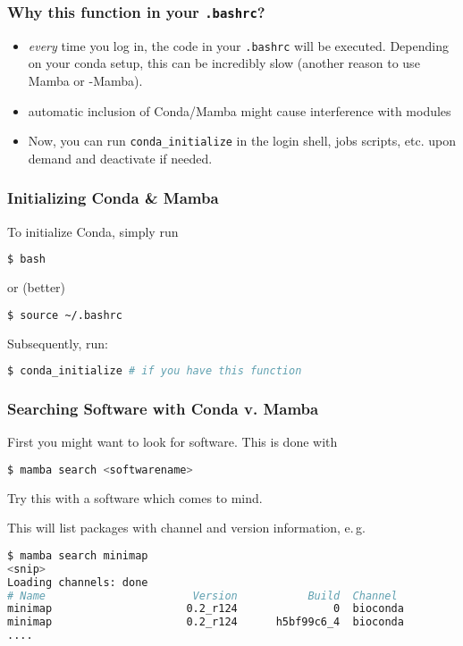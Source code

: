 \begin{frame}[fragile]
  \frametitle{Why this function in your \texttt{.bashrc}?}
  \begin{docs}
  	\begin{itemize}[<+->]
  		\item \emph{every} time you log in, the code in your \texttt{.bashrc} will be executed. Depending on your conda setup, this can be incredibly slow (another reason to use Mamba or \textmu-Mamba).
  		\item automatic inclusion of Conda/Mamba might cause interference with modules
  		\item Now, you can run \verb+conda_initialize+ in the login shell, jobs scripts, etc. upon demand and deactivate if needed.
  	\end{itemize}
  \end{docs}
\end{frame}

\begin{frame}[fragile]
  \frametitle{Initializing Conda \& Mamba}
  To initialize Conda, simply run
  \begin{lstlisting}[language=Bash, style=Shell]
$ bash
  \end{lstlisting}
  or (better)
  \begin{lstlisting}[language=Bash, style=Shell]
$ source ~/.bashrc
  \end{lstlisting}
  Subsequently, run: 
  \begin{lstlisting}[language=Bash, style=Shell]
$ conda_initialize # if you have this function
  \end{lstlisting}
\end{frame}



\begin{frame}[fragile]
  \frametitle{Searching Software with Conda v. Mamba}
  First you might want to look for software. This is done with
  \begin{lstlisting}[language=Bash, style=Shell]
$ mamba search <softwarename>
  \end{lstlisting}
  \pause
  \begin{task}
  	Try this with a software which comes to mind.
  \end{task}
  \pause
  This will list packages with channel and version information, e.\,g.
  \begin{lstlisting}[language=Bash, style=Shell, basicstyle=\tiny]
$ mamba search minimap
<snip>
Loading channels: done
# Name                       Version           Build  Channel             
minimap                     0.2_r124               0  bioconda            
minimap                     0.2_r124      h5bf99c6_4  bioconda
....
  \end{lstlisting}
\end{frame}


